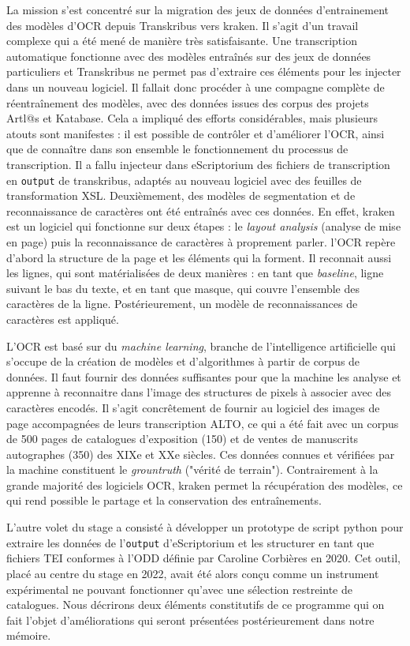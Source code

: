 \documentclass[a4paper,12pt,twoside]{book}
\begin{document}
La mission s'est concentré sur la migration des jeux de données d’entrainement des modèles d’OCR depuis Transkribus vers kraken. Il s'agit d'un travail complexe qui a été mené de manière très satisfaisante. Une transcription automatique fonctionne avec des modèles entraînés sur des jeux de données particuliers et Transkribus ne permet pas d’extraire ces éléments pour les injecter dans un nouveau logiciel. Il fallait donc procéder à une compagne complète de réentraînement des modèles, avec des données issues des corpus des projets Artl@s et Katabase. Cela a impliqué des efforts considérables, mais plusieurs atouts sont manifestes : il est possible de contrôler et d'améliorer l'OCR, ainsi que de connaître dans son ensemble le fonctionnement du processus de transcription. 
Il a fallu injecteur dans eScriptorium des fichiers de transcription en \texttt{output} de transkribus, adaptés au nouveau logiciel avec des feuilles de transformation XSL. Deuxièmement, des modèles de segmentation et de reconnaissance de caractères ont été entraînés avec ces données. En effet, kraken est un logiciel qui fonctionne sur deux étapes : le \textit{layout analysis} (analyse de mise en page) puis la reconnaissance de caractères à proprement parler. l'OCR repère d'abord la structure de la page et les éléments qui la forment. Il reconnait aussi les lignes, qui sont matérialisées de deux manières : en tant que \textit{baseline}, ligne suivant le bas du texte, et en tant que masque, qui couvre l'ensemble des caractères de la ligne. Postérieurement, un modèle de reconnaissances de caractères est appliqué.

L'OCR est basé sur du \textit{machine learning}, branche de l'intelligence artificielle qui s'occupe de la création de modèles et d'algorithmes à partir de corpus de données. Il faut fournir des données suffisantes pour que la machine les analyse et apprenne à reconnaitre dans l'image des structures de pixels à associer avec des caractères encodés. Il s'agit concrêtement de fournir au logiciel des images de page accompagnées de leurs transcription ALTO, ce qui a été fait avec un corpus de 500 pages de catalogues d'exposition (150) et de ventes de manuscrits autographes (350) des XIXe et XXe siècles. Ces données connues et vérifiées par la machine constituent le \textit{grountruth} ("vérité de terrain"). Contrairement à la grande majorité des logiciels OCR, kraken permet la récupération des modèles, ce qui rend possible le partage et la conservation des entraînements. 

L'autre volet du stage a consisté à développer un prototype de script python pour extraire les données de l'\texttt{output} d'eScriptorium et les structurer en tant que fichiers TEI conformes à l'ODD définie par Caroline Corbières en 2020. Cet outil, placé au centre du stage en 2022, avait été alors conçu comme un instrument expérimental ne pouvant fonctionner qu'avec une sélection restreinte de catalogues. Nous décrirons deux éléments constitutifs de ce programme qui on fait l'objet d'améliorations qui seront présentées postérieurement dans notre mémoire. 
\end{document}
